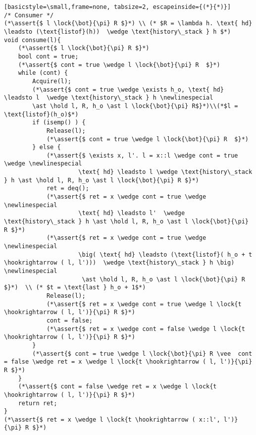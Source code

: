 \documentclass[8pt]{article}
\newcommand{\lock}[2]{ \square \hspace{-1ex} \xrightarrow[#1]{#2}}
\newcommand{\hold}{\text{Hold }}
\newcommand{\assert}[1]{\textcolor{blue}{ \{ #1 \}  } }
\newcommand{\newlinespecial}{\newline \hphantom{100pt}}
\begin{document}
\begin{lstlisting}[basicstyle=\small,frame=none, tabsize=2, escapeinside={(*}{*)}]
/* Consumer */
(*\assert{$ l \lock{\bot}{\pi} R $}*) \\ (* $R = \lambda h. \text{ hd} \leadsto (\text{listof}(h))  \wedge \text{history\_stack } h $*)
void consume(l){
	(*\assert{$ l \lock{\bot}{\pi} R $}*)
	bool cont = true;
	(*\assert{$ cont = true \wedge l \lock{\bot}{\pi} R  $}*)
	while (cont) {
		Acquire(l);
		(*\assert{$ cont = true \wedge \exists h_o, \text{ hd} \leadsto l  \wedge \text{history\_stack } h \newlinespecial
		\ast \hold l, R, h_o \ast l \lock{\bot}{\pi} R$}*)\\(*$l = \text{listof}(h_o)$*)
		if (isemp() ) {
			Release(l);
			(*\assert{$ cont = true \wedge l \lock{\bot}{\pi} R  $}*)	
		} else {
			(*\assert{$ \exists x, l'. l = x::l \wedge cont = true \wedge \newlinespecial
					 \text{ hd} \leadsto l \wedge \text{history\_stack } h \ast \hold l, R, h_o \ast l \lock{\bot}{\pi} R $}*)
			ret = deq();
			(*\assert{$ ret = x \wedge cont = true \wedge \newlinespecial
					 \text{ hd} \leadsto l'  \wedge \text{history\_stack } h \ast \hold l, R, h_o \ast l \lock{\bot}{\pi} R $}*)
			(*\assert{$ ret = x \wedge cont = true \wedge \newlinespecial
					 \big( \text{ hd} \leadsto (\text{listof}( h_o + t \hookrightarrow ( l, l')))  \wedge \text{history\_stack } h \big) \newlinespecial
					  \ast \hold l, R, h_o \ast l \lock{\bot}{\pi} R $}*)  \\ (* $t = \text{last } h_o + 1$*)
			Release(l);
			(*\assert{$ ret = x \wedge cont = true \wedge l \lock{t \hookrightarrow ( l, l')}{\pi} R $}*)
			cont = false;
			(*\assert{$ ret = x \wedge cont = false \wedge l \lock{t \hookrightarrow ( l, l')}{\pi} R $}*)
		}
		(*\assert{$ cont = true \wedge l \lock{\bot}{\pi} R \vee  cont = false \wedge ret = x \wedge l \lock{t \hookrightarrow ( l, l')}{\pi} R $}*)	
	}
	(*\assert{$ cont = false \wedge ret = x \wedge l \lock{t \hookrightarrow ( l, l')}{\pi} R $}*)		
	return ret;
}
(*\assert{$ ret = x \wedge l \lock{t \hookrightarrow ( x::l', l')}{\pi} R $}*)
 

\end{lstlisting}
\end{document}
